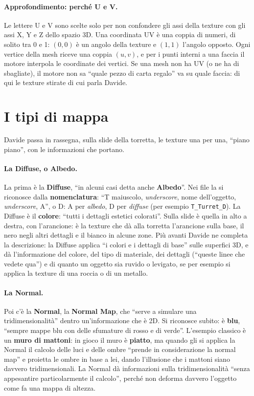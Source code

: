 \paragraph{Approfondimento: perché U e V.} Le lettere U e V sono scelte solo per non
confondere gli assi della texture con gli assi X, Y e Z dello spazio 3D. Una coordinata
UV è una coppia di numeri, di solito tra 0 e 1: $(0,0)$ è un angolo della texture e
$(1,1)$ l'angolo opposto. Ogni vertice della mesh riceve una coppia $(u,v)$, e per i
punti interni a una faccia il motore interpola le coordinate dei vertici. Se una mesh
non ha UV (o ne ha di sbagliate), il motore non sa ``quale pezzo di carta regalo'' va
su quale faccia: di qui le texture stirate di cui parla Davide.

\section{I tipi di mappa}
\label{ue3:sec:mappe}

Davide passa in rassegna, sulla slide della torretta, le texture una per una, ``piano
piano'', con le informazioni che portano.

\paragraph{La Diffuse, o Albedo.} La prima è la \textbf{Diffuse}, ``in alcuni casi
detta anche \textbf{Albedo}''. Nei file la si riconosce dalla \textbf{nomenclatura}:
``T maiuscolo, \emph{underscore}, nome dell'oggetto, \emph{underscore}, A'', o D: A per
\emph{albedo}, D per \emph{diffuse} (per esempio \texttt{T\_Turret\_D}). La Diffuse è
il \textbf{colore}: ``tutti i dettagli estetici colorati''. Sulla slide è quella in alto
a destra, con l'arancione: è la texture che dà alla torretta l'arancione sulla base, il
nero negli altri dettagli e il bianco in alcune zone. Più avanti Davide ne completa la
descrizione: la Diffuse applica ``i colori e i dettagli di base'' sulle superfici 3D, e
dà l'informazione del colore, del tipo di materiale, dei dettagli (``queste linee che
vedete qua'') e di quanto un oggetto sia ruvido o levigato, se per esempio si applica la
texture di una roccia o di un metallo.

\paragraph{La Normal.} Poi c'è la \textbf{Normal}, la \textbf{Normal Map}, che ``serve
a simulare una tridimensionalità'' dentro un'informazione che è 2D. Si riconosce
subito: è \textbf{blu}, ``sempre mappe blu con delle sfumature di rosso e di verde''.
L'esempio classico è un \textbf{muro di mattoni}: in gioco il muro è \textbf{piatto}, ma
quando gli si applica la Normal il calcolo delle luci e delle ombre ``prende in
considerazione la normal map'' e proietta le ombre in base a lei, dando l'illusione che
i mattoni siano davvero tridimensionali. La Normal dà informazioni sulla
tridimensionalità ``senza appesantire particolarmente il calcolo'', perché non deforma
davvero l'oggetto come fa una mappa di altezza.

